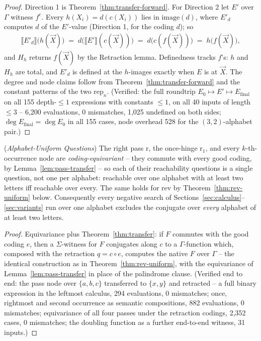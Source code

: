 \begin{proof}
    Direction 1 is Theorem~\ref{thm:transfer-forward}. For Direction 2 let
    $E'$ over $\Gamma$ witness $f^c$. Every $h(X_i) = d(c(X_i))$ lies in
    $\mathrm{image}(d)$, where $E'_d$ computes $d$ of the $E'$-value
    (Direction 1, for the coding $d$); so
    \begin{align*}
        \llbracket E'_d \rrbracket\big(h(\vec X)\big)
        \;=\; d\big(\llbracket E' \rrbracket(c(\vec X))\big)
        \;=\; d\big(c(f(\vec X))\big) \;=\; h\big(f(\vec X)\big),
    \end{align*}
    and $H_h$ returns $f(\vec X)$ by the Retraction lemma. Definedness
    tracks $f$'s: $h$ and $H_h$ are total, and $E'_d$ is defined at the
    $h$-images exactly when $E$ is at $\vec X$. The degree and node claims
    follow from Theorem~\ref{thm:transfer-forward} and the constant patterns
    of the two $\mathrm{rep}_n$. (Verified: the full roundtrip $E_0 \mapsto
    E' \mapsto E_{\mathrm{final}}$ on all 155 depth-$\le 1$ expressions
    with constants $\le 1$, on all 40 inputs of length $\le 3$ -- 6,200
    evaluations, 0 mismatches, 1,025 undefined on both sides; $\deg
    E_{\mathrm{final}} = \deg E_0$ in all 155 cases, node overhead 528 for
    the $(3,2)$-alphabet pair.)
\end{proof}

\begin{corollary}
    (\emph{Alphabet-Uniform Questions})
    \label{cor:uniform}
    The right pass $\mathrm{r}$, the once-hinge $\mathrm{r}_1$, and every
    $k$-th-occurrence node are \emph{coding-equivariant} -- they commute
    with every good coding, by Lemma~\ref{lem:pass-transfer} -- so each of
    their reachability questions is a single question, not one per
    alphabet: reachable over one alphabet with at least two letters iff
    reachable over every. The same holds for $\mathrm{rev}$ by
    Theorem~\ref{thm:rev-uniform} below. Consequently every negative
    search of Sections~\ref{sec:calculus}--\ref{sec:variants} run over one
    alphabet excludes the conjugate over \emph{every} alphabet of at least
    two letters.
\end{corollary}

\begin{proof}
    Equivariance plus Theorem~\ref{thm:transfer}: if $F$ commutes with the
    good coding $e$, then a $\Sigma$-witness for $F$ conjugates along $c$
    to a $\Gamma$-function which, composed with the retraction $q = c
    \circ e$, computes the native $F$ over $\Gamma$ -- the identical
    construction as in Theorem~\ref{thm:rev-uniform}, with the equivariance
    of Lemma~\ref{lem:pass-transfer} in place of the palindrome clause.
    (Verified end to end: the pass node over $\{a,b,c\}$ transferred to
    $\{x,y\}$ and retracted -- a full binary expression in the leftmost
    calculus, 294 evaluations, 0 mismatches; once, rightmost and second
    occurrence as semantic compositions, 882 evaluations, 0 mismatches;
    equivariance of all four passes under the retraction codings, 2,352
    cases, 0 mismatches; the doubling function as a further end-to-end
    witness, 31 inputs.)
\end{proof}

